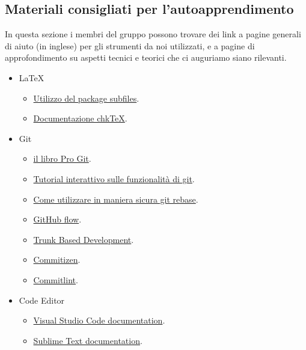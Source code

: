 \documentclass[../norme-di-progetto.tex]{subfiles}
\begin{document}
\subsection{Materiali consigliati per l'autoapprendimento}%
\label{sub:materiali_consigliati_per_l_autoapprendimento}

In questa sezione i membri del gruppo possono trovare dei link a pagine generali di aiuto (in inglese) per gli strumenti da noi utilizzati, e a pagine di approfondimento su aspetti tecnici e teorici che ci auguriamo siano rilevanti.

\begin{itemize}
  \item \LaTeX{}
        \begin{itemize}
          \item \href{https://www.overleaf.com/learn/latex/Multi-file_LaTeX_projects#The_subfiles_package}{Utilizzo del package subfiles}.
          \item \href{https://www.nongnu.org/chktex/ChkTeX.pdf}{Documentazione chk\TeX}.
        \end{itemize}

  \item Git
        \begin{itemize}
          \item \href{https://git-scm.com/book/en/v2}{il libro Pro Git}.
          \item \href{https://learngitbranching.js.org/}{Tutorial interattivo sulle funzionalità di git}.
          \item \href{https://git-scm.com/book/en/v2/Git-Branching-Rebasing}{Come utilizzare in maniera sicura git rebase}.
          \item \href{https://guides.github.com/introduction/flow/}{GitHub flow}.
          \item \href{https://trunkbaseddevelopment.com/}{Trunk Based Development}.
          \item \href{https://commitizen.github.io/cz-cli/}{Commitizen}.
          \item \href{https://commitlint.js.org/}{Commitlint}.
        \end{itemize}

  \item Code Editor
        \begin{itemize}
          \item \href{https://code.visualstudio.com/docs}{Visual Studio Code documentation}.
          \item \href{https://www.sublimetext.com/docs/3/}{Sublime Text documentation}.
        \end{itemize}


\end{itemize}
\end{document}
